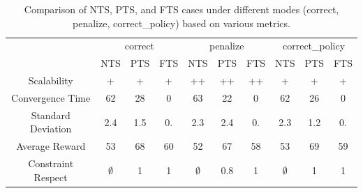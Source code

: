 \documentclass[runningheads]{llncs}
\theoremstyle{freethm}
\theoremstyle{proofoutline}
\begin{document}
\begin{table}[h!]
    \centering
    \caption{Comparison of NTS, PTS, and FTS cases under different modes (correct, penalize, correct\_policy) based on various metrics. \vspace{0.2cm} }\label{tab:results}
    \setlength{\tabcolsep}{5pt}
    \begin{tabular}{cccccccccc}
        \cline{2-10}
                           & \multicolumn{3}{c}{correct} & \multicolumn{3}{c}{penalize} & \multicolumn{3}{c}{correct\_policy} \\
        \cline{2-10}
                           & NTS                         & PTS                          & FTS                                   & NTS         & PTS & FTS & NTS         & PTS & FTS \\
        \hline
        Scalability & + & + & + & ++ & ++ & ++ & + & + & + \\
        Convergence Time & 62 & 28 & 0 & 63 & 22  & 0 & 62 & 26  & 0 \\
        Standard Deviation & 2.4 & 1.5 & 0. & 2.3 & 2.4 & 0. & 2.3 & 1.2 & 0. \\
        Average Reward & 53 & 68 & 60 & 52 & 67  & 58 & 53 & 69 & 59 \\
        Constraint Respect & $\emptyset$                 & 1                            & 1                                     & $\emptyset$ & 0.8 & 1   & $\emptyset$ & 1   & 1 \\
    \end{tabular}
\end{table}
%
%
%
%
%
%
\end{document}
